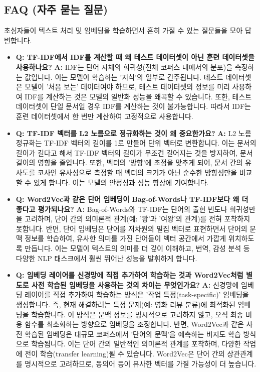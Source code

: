 \documentclass[11pt,a4paper]{article}
\begin{document}
\begin{tcolorbox}[examplebox, title=NLTK 스테밍 코드 예시]
\newpage
\section*{FAQ (자주 묻는 질문)}

\begin{tcolorbox}[mybox, title=FAQ: 초심자를 위한 질문과 답변]
초심자들이 텍스트 처리 및 임베딩을 학습하면서 흔히 가질 수 있는 질문들을 모아 답변합니다.
\end{tcolorbox}

\begin{itemize}
    \item \textbf{Q: TF-IDF에서 IDF를 계산할 때 왜 테스트 데이터셋이 아닌 훈련 데이터셋을 사용하나요?}
    \textbf{A:} IDF는 단어 자체의 희귀성(전체 코퍼스 내에서의 분포)을 측정하는 값입니다. 이는 모델이 학습하는 '지식'의 일부로 간주됩니다. 테스트 데이터셋은 모델이 '처음 보는' 데이터여야 하므로, 테스트 데이터셋의 정보를 미리 사용하여 IDF를 계산하는 것은 모델의 일반화 성능을 왜곡할 수 있습니다. 또한, 테스트 데이터셋이 단일 문서일 경우 IDF를 계산하는 것이 불가능합니다. 따라서 IDF는 훈련 데이터셋에서 한 번만 계산하여 고정적으로 사용합니다.

    \item \textbf{Q: TF-IDF 벡터를 L2 노름으로 정규화하는 것이 왜 중요한가요?}
    \textbf{A:} L2 노름 정규화는 TF-IDF 벡터의 길이를 1로 만들어 단위 벡터로 변환합니다. 이는 문서의 길이가 길다고 해서 TF-IDF 벡터의 길이가 무조건 길어지는 것을 방지하여, 문서 길이의 영향을 줄입니다. 또한, 벡터의 '방향'에 초점을 맞추게 되어, 문서 간의 유사도를 코사인 유사성으로 측정할 때 벡터의 크기가 아닌 순수한 방향성만을 비교할 수 있게 합니다. 이는 모델의 안정성과 성능 향상에 기여합니다.

    \item \textbf{Q: Word2Vec과 같은 단어 임베딩이 Bag-of-Words나 TF-IDF보다 왜 더 좋다고 평가되나요?}
    \textbf{A:} Bag-of-Words와 TF-IDF는 단어의 출현 빈도나 희귀성만을 고려하며, 단어 간의 의미론적 관계(예: '왕'과 '여왕'의 관계)를 전혀 포착하지 못합니다. 반면, 단어 임베딩은 단어를 저차원의 밀집 벡터로 표현하면서 단어의 문맥 정보를 학습하여, 유사한 의미를 가진 단어들이 벡터 공간에서 가깝게 위치하도록 만듭니다. 이는 모델이 텍스트의 의미를 더 깊이 이해하고, 번역, 감성 분석 등 다양한 NLP 태스크에서 훨씬 뛰어난 성능을 발휘하게 합니다.

    \item \textbf{Q: 임베딩 레이어를 신경망에 직접 추가하여 학습하는 것과 Word2Vec처럼 별도로 사전 학습된 임베딩을 사용하는 것의 차이는 무엇인가요?}
    \textbf{A:} 신경망에 임베딩 레이어를 직접 추가하여 학습하는 방식은 '작업 특정(task-specific)' 임베딩을 생성합니다. 즉, 현재 해결하려는 특정 문제(예: 영화 리뷰 분류)에 최적화된 임베딩을 학습합니다. 이 방식은 문맥 정보를 명시적으로 고려하지 않고, 오직 최종 비용 함수를 최소화하는 방향으로 임베딩을 조정합니다. 반면, Word2Vec과 같은 사전 학습된 임베딩은 대규모 코퍼스에서 '단어의 문맥'을 예측하는 비지도 학습 방식으로 학습됩니다. 이는 단어 간의 일반적인 의미론적 관계를 포착하며, 다양한 작업에 전이 학습(transfer learning)될 수 있습니다. Word2Vec은 단어 간의 상관관계를 명시적으로 고려하므로, 동의어 등이 유사한 벡터를 가질 가능성이 더 높습니다.


\end{itemize}
\end{tcolorbox}
\end{document}
